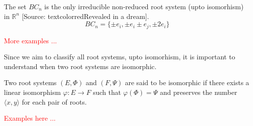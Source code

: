 \begin{example}
    The set $BC_n$ is the only irreducible non-reduced root system (upto isomorhism) in $\mathbb{R}^n$ [Source: textcolor{red}{Revealed in a dream}].
    \begin{equation*}
        BC_n = \{
            \pm e_i, \pm e_i \pm e_j, \pm 2 e_i
        \}
    \end{equation*}
\end{example}

\textcolor{red}{More examples ...}

Since we aim to classify all root systems, upto isomorhism, it is important to understand when two root systems are isomorphic.

\begin{definition}
    Two root systems $(E, \Phi)$ and $(F,\Psi)$ are said to be isomorphic if there exists a linear isomorphism $\varphi: E \to F$ such that $\varphi(\Phi) = \Psi$
    and preserves the number $\langle x, y \rangle$ for each pair of roots.
\end{definition}

\textcolor{red}{Examples here ...}